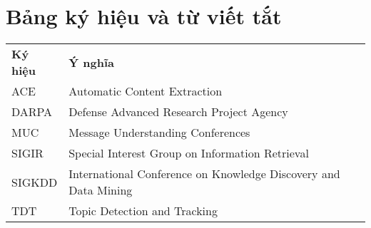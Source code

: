 \chapter*{Bảng ký hiệu và từ viết tắt} %

\begin{center}
	\begin{table}[htb]
	\begin{tabular}{ll}
		\bfseries{Ký hiệu}&\hspace{1in} \bfseries{Ý nghĩa}\vspace{2ex}\\
		ACE    & \hspace{0.5in}Automatic Content Extraction\\
		DARPA   & \hspace{0.5in}Defense Advanced Research Project Agency\\
		MUC   & \hspace{0.5in}Message Understanding Conferences\\
	SIGIR   & \hspace{0.5in}Special Interest Group on Information Retrieval\\
	SIGKDD & \hspace{0.5in}International Conference on Knowledge Discovery and Data Mining \\		
	TDT   & \hspace{0.5in}Topic Detection and Tracking\\
		
	\end{tabular}
	\end{table}
\end{center}
